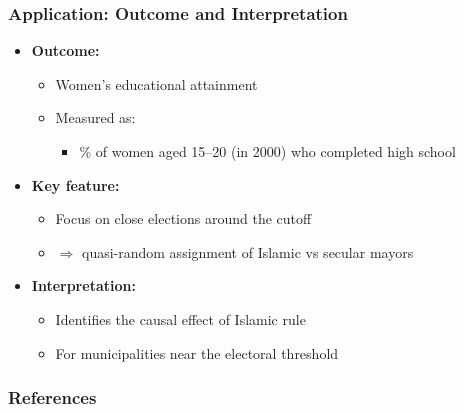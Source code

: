 \documentclass[12pt, compress]{beamer}
\begin{document}
\begin{frame}
	\frametitle{Application: Outcome and Interpretation}

\begin{itemize}
	\item \textbf{Outcome:}
	\begin{itemize}
		\item Women's educational attainment
		\item Measured as:
		\begin{itemize}
			\item \% of women aged 15--20 (in 2000) who completed high school
		\end{itemize}
	\end{itemize}
	
	\medskip
	
	\item \textbf{Key feature:}
	\begin{itemize}
		\item Focus on close elections around the cutoff
		\item $\Rightarrow$ quasi-random assignment of Islamic vs secular mayors
	\end{itemize}
	
	\medskip
	
	\item \textbf{Interpretation:}
	\begin{itemize}
		\item Identifies the causal effect of Islamic rule
		\item For municipalities near the electoral threshold
	\end{itemize}
\end{itemize}

\end{frame}

\begin{frame}[allowframebreaks]
	\frametitle{References}
		{\footnotesize
		
		}
\end{frame}
\end{document}
